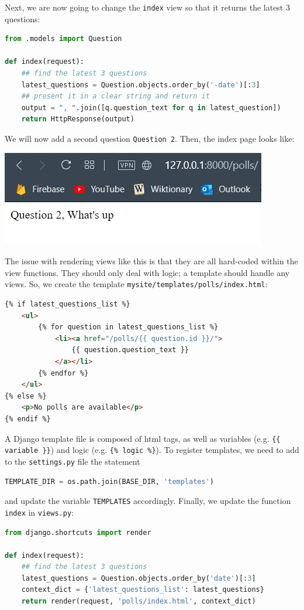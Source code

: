 \documentclass[a4paper, openany]{memoir}
\begin{document}
    Next, we are now going to change the \texttt{index} view so that it returns the latest 3 questions:
\begin{lstlisting}[language=python]
from .models import Question

def index(request):
    ## find the latest 3 questions
    latest_questions = Question.objects.order_by('-date')[:3]
    ## present it in a clear string and return it
    output = ", ".join([q.question_text for q in latest_question])
    return HttpResponse(output)
\end{lstlisting}
    We will now add a second question \texttt{Question 2}. Then, the index page looks like:
    \begin{center}
        \includegraphics[scale=0.7]{src/Django7.PNG}
    \end{center}
    The issue with rendering views like this is that they are all hard-coded within the view functions. They should only deal with logic; a template should handle any views. So, we create the template \texttt{mysite/templates/polls/index.html}:
\begin{lstlisting}[language=html]
{% if latest_questions_list %}
    <ul>
        {% for question in latest_questions_list %}
            <li><a href="/polls/{{ question.id }}/">
                {{ question.question_text }}
            </a></li>
        {% endfor %}
    </ul>
{% else %}
    <p>No polls are available</p>
{% endif %}
\end{lstlisting}
    A Django template file is composed of html tags, as well as variables (e.g. \texttt{\{\{  variable \}\}}) and logic (e.g. \texttt{\{\% logic \%\}}). To register templates, we need to add to the \texttt{settings.py} file the statement 
\begin{lstlisting}[language=python]
TEMPLATE_DIR = os.path.join(BASE_DIR, 'templates')
\end{lstlisting}
    and update the variable \texttt{TEMPLATES} accordingly. Finally, we update the function \texttt{index} in \texttt{views.py}:
\begin{lstlisting}[language=python]
from django.shortcuts import render

def index(request):
    ## find the latest 3 questions
    latest_questions = Question.objects.order_by('date')[:3]
    context_dict = {'latest_questions_list': latest_questions}
    return render(request, 'polls/index.html', context_dict)
\end{lstlisting}
\end{document}
